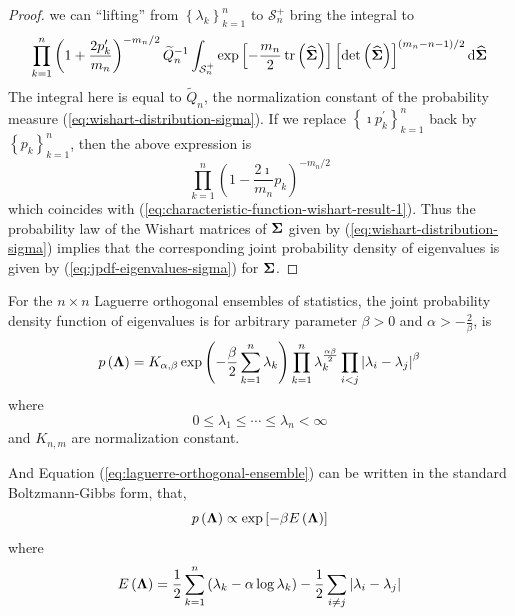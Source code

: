 \begin{proof}
	we can ``lifting'' from \(\left\{\lambda_{k}\right\}_{k=1}^{n}\) to \(\mathcal{S}_{n}^{+}\) bring the integral to
	\begin{equation*}
		\prod_{k=1}^{n}\left(1+\frac{2p_{k}^{\prime}}{m_{n}}\right)^{-m_{n}/2}\widetilde{Q}_{n}^{-1}\int_{\mathcal{S}_{n}^{+}}\exp\left[-\frac{m_{n}}{2}\operatorname{tr}\left(\widehat{\boldsymbol{\Sigma}}\right)\right]\left[\det\left(\widehat{\boldsymbol{\Sigma}}\right)\right]^{(m_{n}-n-1)/2}\mathop{}\!\mathrm{d}\widehat{\boldsymbol{\Sigma}}
	\end{equation*}
	The integral here is equal to \(\widetilde{Q}_{n}\), the normalization constant of the probability measure (\ref{eq:wishart-distribution-sigma}). If we replace \(\left\{\imath p_{k}^{\prime}\right\}_{k=1}^{n}\) back by \(\left\{p_{k}\right\}_{k=1}^{n}\), then the above expression is
	\begin{equation*}
		\prod_{k=1}^{n}\left(1-\frac{2\imath}{m_n}p_{k}\right)^{-m_{n}/2}
	\end{equation*}
	which coincides with (\ref{eq:characteristic-function-wishart-result-1}). Thus the probability law of the Wishart matrices of \(\boldsymbol{\Sigma}\) given by (\ref{eq:wishart-distribution-sigma}) implies that the corresponding joint probability density of eigenvalues is given by (\ref{eq:jpdf-eigenvalues-sigma}) for \(\boldsymbol{\Sigma}\).
\end{proof}

\begin{definition}
	For the \(n\times n\) Laguerre orthogonal ensembles of statistics, the joint probability density function of eigenvalues is
	for arbitrary parameter \(\beta>0\) and \(\alpha>-\frac{2}{\beta}\), is
	\begin{equation}
		p\left(\boldsymbol{\Lambda}\right)=K_{\alpha,\beta}\exp\left(-\frac{\beta}{2}\sum_{k=1}^{n}\lambda_{k}\right)\prod_{k=1}^{n} \lambda_{k}^{\frac{\alpha\beta}{2}}\prod_{i<j}\left|\lambda_{i}-\lambda_{j}\right|^{\beta}
		\label{eq:laguerre-orthogonal-ensemble}
	\end{equation}
	where
	\begin{equation*}
		0\leq\lambda_{1}\leq\cdots\leq\lambda_{n}<\infty
	\end{equation*}
	and \(K_{n,m}\) are normalization constant.
\end{definition}

And Equation (\ref{eq:laguerre-orthogonal-ensemble}) can be written in the standard Boltzmann-Gibbs form, that,
\begin{equation*}
	p\left(\boldsymbol{\Lambda}\right)\propto\exp\left[-\beta E\left(\boldsymbol{\Lambda}\right)\right]
\end{equation*}
where
\begin{equation}
	E\left(\boldsymbol{\Lambda}\right)=\frac{1}{2}\sum_{k=1}^{n}\left(\lambda_{k}-\alpha\log\lambda_{k}\right)-\frac{1}{2}\sum_{i\neq j}\left|\lambda_{i}-\lambda_{j}\right|
\end{equation}

